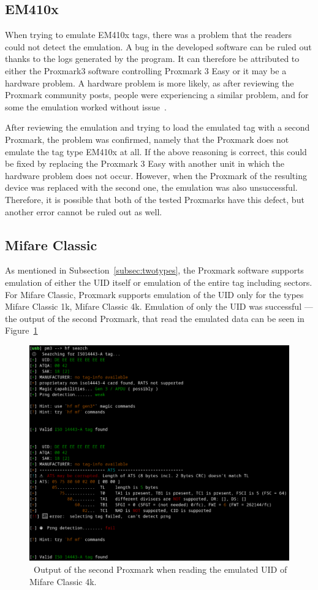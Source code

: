 \subsection{EM410x}

When trying to emulate EM410x tags, there was a problem that the readers could not detect the emulation. A bug in the developed software can be ruled out thanks to the logs generated by the program. It can therefore be attributed to either the Proxmark3 software controlling Proxmark 3 Easy or it may be a hardware problem. A hardware problem is more likely, as after reviewing the Proxmark community posts, people were experiencing a similar problem, and for some the emulation worked without issue~\cite{notworkingemulation}.

After reviewing the emulation and trying to load the emulated tag with a second Proxmark, the problem was confirmed, namely that the Proxmark does not emulate the tag type EM410x at all. If the above reasoning is correct, this could be fixed by replacing the Proxmark 3 Easy with another unit in which the hardware problem does not occur. However, when the Proxmark of the resulting device was replaced with the second one, the emulation was also unsuccessful. Therefore, it is possible that both of the tested Proxmarks have this defect, but another error cannot be ruled out as well.


\subsection{Mifare Classic}
As mentioned in Subsection~\ref{subsec:twotypes}, the Proxmark software supports emulation of either the UID itself or emulation of the entire tag including sectors. For Mifare Classic, Proxmark supports emulation of the UID only for the types Mifare Classic 1k, Mifare Classic 4k. Emulation of only the UID was successful --- the output of the second Proxmark, that read the emulated data can be seen in Figure~\ref{fig:emulateduidclassic}

\begin{figure}[ht]
  \centering
  \includegraphics[width=12cm]{text/testing/classic_4k_uid.png}
  \caption{~Output of the second Proxmark when reading the emulated UID of Mifare Classic 4k.}
  \label{fig:emulateduidclassic}
\end{figure}

